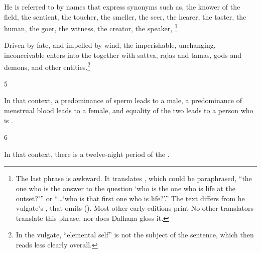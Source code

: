 \begin{translation}
He is referred to by names that express synonyms such as, the knower
of the field, the sentient, the toucher, the smeller, the seer, the
hearer, the taster, the human, the goer, the witness, the creator, the
speaker, \footnote{The last phrase is awkward.  It translates , which could be paraphrased, “the one who is the
    answer to the question `who is the one who is life at the outset?'” or
    “\ldots `who is that first one who is life?'.” The text differs from
    he vulgate's , that omits 
    (). Most other early editions print 
    No other translators translate this phrase, nor does Ḍalhaṇa gloss
    it.}
%    
%    





Driven by fate, and impelled by wind, the imperishable, unchanging,
inconceivable  enters into the
 together with sattva, rajas and tamas, gods
and demons, and other entities.\footnote{In the vulgate,
     “elemental self” is not the subject of the sentence,
    which then reads less clearly overall.}

\item [5]

In that context, a predominance of sperm leads to a male, a
predominance of menstrual blood leads to a female, and equality of the
two leads to a person who is .

\item[6]

In that context, there is a twelve-night period of the .


\bigskip

\begin{tt}
    \raggedright


\end{tt}
\end{translation}

